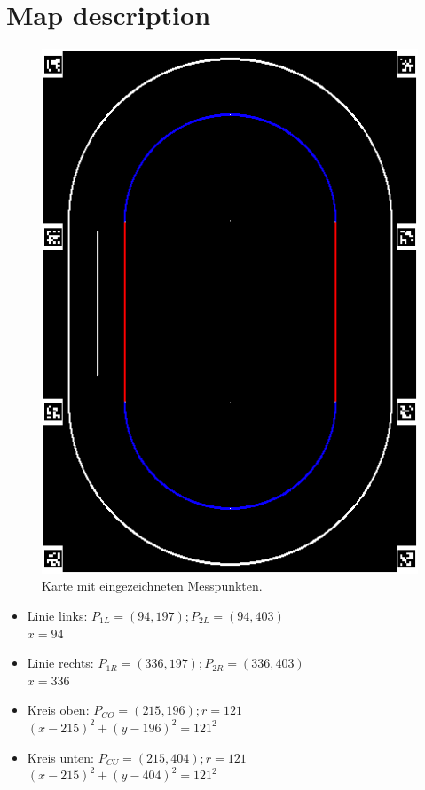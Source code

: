 \documentclass[10pt,oneside,a4paper]{article}
\begin{document}
  \section{Map description}
    \begin{figure}[h]
      \centering
      \includegraphics[scale=0.5]{pictures/map.png}
      \caption{Karte mit eingezeichneten Messpunkten.}
    \end{figure}
    \begin{itemize}
      \item{Linie links:} \( P_{1L} = (94, 197); P_{2L} = (94, 403) \) \\
        \( x = 94 \)
      \item{Linie rechts:} \( P_{1R} = (336, 197); P_{2R} = (336, 403) \) \\
        \( x = 336 \)
      \item{Kreis oben:} \( P_{CO} = (215, 196); r = 121 \) \\
        \( (x - 215)^2 + (y - 196)^2 = 121^2 \)
      \item{Kreis unten:} \( P_{CU} = (215, 404); r = 121 \) \\
        \( (x - 215)^2 + (y - 404)^2 = 121^2 \)
    \end{itemize}
\end{document}
